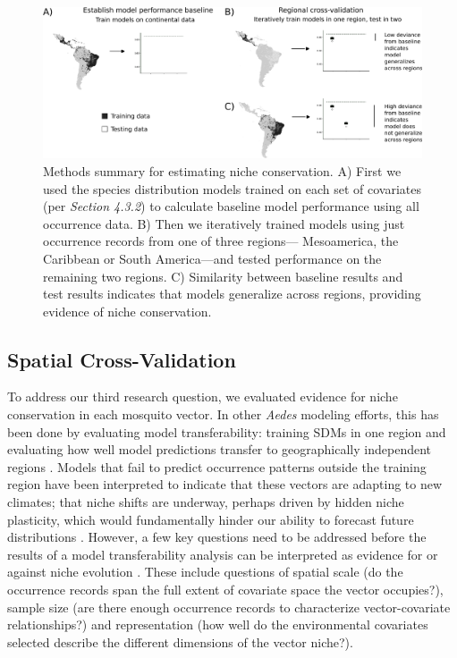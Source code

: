 \begin{figure}
\includegraphics[width=\textwidth]{figures/ch3-cv-conceptual2.pdf}
\centering
\caption[Methods summary for estimating niche conservation.]{Methods summary for estimating niche conservation. A) First we used the species distribution models trained on each set of covariates (per \textit{Section 4.3.2}) to calculate baseline model performance using all occurrence data. B) Then we iteratively trained models using just occurrence records from one of three regions— Mesoamerica, the Caribbean or South America—and tested performance on the remaining two regions. C) Similarity between baseline results and test results indicates that models generalize across regions, providing evidence of niche conservation.}
\label{fig:cv-conceptual}
\end{figure}

\subsection{Spatial Cross-Validation}

To address our third research question, we evaluated evidence for niche conservation in each mosquito vector. In other \textit{Aedes} modeling efforts, this has been done by evaluating model transferability: training SDMs in one region and evaluating how well model predictions transfer to geographically independent regions \cite{Yates2018-hm}. Models that fail to predict occurrence patterns outside the training region have been interpreted to indicate that these vectors are adapting to new climates; that niche shifts are underway, perhaps driven by hidden niche plasticity, which would fundamentally hinder our ability to forecast future distributions \cite{Medley2010-fa, Carlson2016-rc}. However, a few key questions need to be addressed before the results of a model transferability analysis can be interpreted as evidence for or against niche evolution \cite{Liu2020-wk}. These include questions of spatial scale (do the occurrence records span the full extent of covariate space the vector occupies?), sample size (are there enough occurrence records to characterize vector-covariate relationships?) and representation (how well do the environmental covariates selected describe the different dimensions of the vector niche?).

